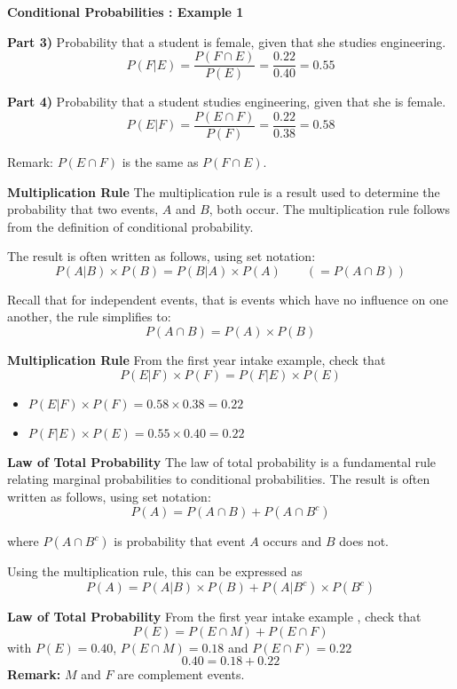 \documentclass[]{report}
\begin{document}
{
	\textbf{Conditional Probabilities : Example 1}
	
	\textbf{Part 3)} Probability that a student is female, given that she studies engineering.
	\[ P(F|E) = \frac{P(F \cap E)}{P(E)}  = \frac{0.22}{0.40} = 0.55 \]
	
	\textbf{Part 4)} Probability that a student studies engineering, given that she is female.
	\[ P(E|F) = \frac{P(E \cap F)}{P(F)}  = \frac{0.22}{0.38} = 0.58 \]
	
	
	Remark: $P(E \cap F)$ is the same as $P(F \cap E)$.
	
	
}
{
	\textbf{Multiplication Rule}
	The multiplication rule is a result used to determine the probability that two events, $A$ and $B$, both occur.
	The multiplication rule follows from the definition of conditional probability.\\ \bigskip
	
	The result is often written as follows, using set notation:
	\[ P(A|B)\times P(B) = P(B|A)\times P(A) \qquad \left( = P(A \cap B) \right) \]
	
	Recall that for independent events, that is events which have no influence on one another, the rule simplifies to:
	\[P(A \cap B)  = P(A)\times P(B) \]
}
{
	\textbf{Multiplication Rule}
	From the first year intake example, check that
	\[ P(E|F)\times P(F) = P(F|E)\times P(E)\]
	\begin{itemize}
		\item $P(E|F)\times P(F) = 0.58 \times 0.38  = 0.22$
		\item $P(F|E)\times P(E) = 0.55 \times 0.40  = 0.22$
	\end{itemize}
}
{
	\textbf{Law of Total Probability}
	The law of total probability is a fundamental rule relating marginal probabilities to conditional probabilities. The result is often written as follows, using set notation:
	\[ P(A)  = P(A \cap B) + P(A \cap B^c) \]
	
	where $P(A \cap B^c)$ is probability that event $A$ occurs and $B$ does not.\\ \bigskip
	
	
	Using the multiplication rule, this can be expressed as
	\[ P(A) = P(A | B)\times P(B) + P(A | B^{c})\times P(B^{c}) \]
}
{
	\textbf{Law of Total Probability}
	From the first year intake example , check that
	\[ P(E)  = P(E \cap M) + P(E \cap F) \]
	with $ P(E) = 0.40$, $ P(E \cap M) = 0.18$ and  $ P(E \cap F) = 0.22$
	\[ 0.40  = 0.18 + 0.22 \]
	\textbf{Remark:}  $M$ and $F$ are complement events.
	
}
\newpage
\end{document}
